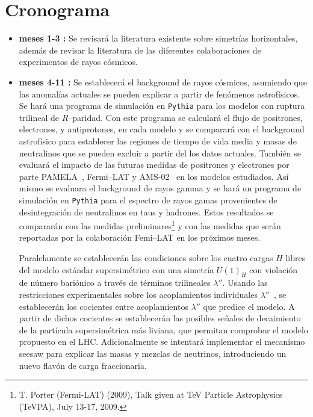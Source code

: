 \section{ Cronograma}



\begin{itemize}

\item {\bf meses 1-3 :} Se revisará la literatura existente sobre
  simetrías horizontales, además de revisar la literatura de  las diferentes colaboraciones de experimentos de rayos cósmicos.

\item {\bf meses 4-11 : }   Se establecerá el background de rayos cósmicos, asumiendo que las anomalías actuales se pueden explicar a partir de fenómenos astrofísicos. Se hará una programa de simulación en \texttt{Pythia} \cite{Sjostrand:2006za} para los modelos con ruptura trilineal de $R$--paridad.
Con este programa se calculará el flujo de positrones, electrones, y antiprotones, en cada modelo y se comparará con el background astrofísico para establecer las regiones de tiempo de vida media y masas de neutralinos que se pueden excluir a partir del los datos actuales. También se evaluará el impacto de las futuras medidas de positrones y electrones por parte PAMELA~\cite{Adriani:2008zr}, Fermi--LAT\cite{Abdo:2009zk} y AMS-02~\cite{ams:2009} en los modelos estudiados. Así mismo se evaluara el background de rayos gamma y se hará un programa de simulación en \texttt{Pythia} para el espectro de rayos gamas provenientes de desintegración de neutralinos en taus y hadrones.
Estos resultados se compararán con las medidas preliminares\footnote{T. Porter (Fermi-LAT) (2009), Talk given at TeV Particle Astrophysics (TeVPA), July 13-17, 2009.} y con las medidas que serán reportadas por la colaboración Femi--LAT en los próximos meses.

Paralelamente se establecerán las condiciones sobre los cuatro cargas $H$ libres del modelo estándar supersimétrico con una simetría $U(1)_H$ con violación de número bariónico a través de términos trilineales $\lambda''$. Usando las restricciones experimentales sobre los acoplamientos individuales $\lambda''$~\cite{Barbier:2004ez}, se establecerán los cocientes entre acoplamientos $\lambda''$ que predice el modelo. A partir de dichos cocientes se establecerán las posibles señales de decaimiento de la partícula supersimétrica más liviana,  que permitan comprobar el modelo propuesto en el LHC. Adicionalmente se intentará implementar el mecanismo seesaw para explicar las masas y mezclas de neutrinos, introduciendo un nuevo flavón de carga fraccionaria.


\end{itemize}
